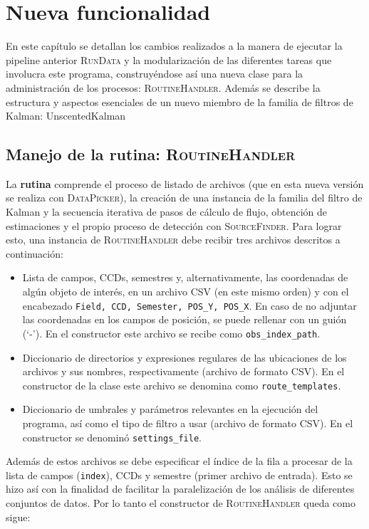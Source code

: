 \chapter{Nueva funcionalidad}
\label{ch:news}
En este cap\'itulo se detallan los cambios realizados a la  manera de ejecutar la pipeline anterior \textsc{RunData} y la modularizaci\'on de las diferentes tareas que involucra este programa, construy\'endose as\'i una nueva clase para la administraci\'on de los procesos: \textsc{RoutineHandler}. Adem\'as se describe la estructura y aspectos esenciales de un nuevo miembro de la familia de filtros de Kalman: \textsf{UnscentedKalman}


\section{Manejo de la rutina: \textsc{RoutineHandler}}

La \textbf{rutina} comprende el proceso de listado de archivos (que en esta nueva versi\'on se realiza con \textsc{DataPicker}), la creaci\'on de una instancia de la familia del filtro de Kalman y la secuencia iterativa de pasos de c\'alculo de flujo, obtenci\'on de estimaciones y el propio proceso de detecci\'on con \textsc{SourceFinder}. Para lograr esto, una instancia de \textsc{RoutineHandler} debe recibir tres archivos descritos a continuaci\'on:

\begin{itemize}
\item Lista de campos, CCDs, semestres y, alternativamente, las coordenadas de alg\'un objeto de inter\'es, en un archivo CSV (en este mismo orden) y con el encabezado \texttt{Field, CCD, Semester, POS\_Y, POS\_X}. En caso de no adjuntar las coordenadas en los campos de posici\'on, se puede rellenar con un gui\'on (`-'). En el constructor este archivo se recibe como \texttt{obs\_index\_path}.
\item Diccionario de directorios y expresiones regulares de las ubicaciones de los archivos y sus nombres, respectivamente (archivo de formato CSV). En el constructor de la clase este archivo se denomina como \texttt{route\_templates}.
\item Diccionario de umbrales y par\'ametros relevantes en la ejecuci\'on del programa, as\'i como el tipo de filtro a usar (archivo de formato CSV). En el constructor se denomin\'o \texttt{settings\_file}.
\end{itemize}
\bigskip
Adem\'as de estos archivos se debe especificar el \'indice de la fila a procesar de la lista de campos (\texttt{index}), CCDs y semestre (primer archivo de entrada). Esto se hizo as\'i con la finalidad de facilitar la paralelizaci\'on de los an\'alisis de diferentes conjuntos de datos. Por lo tanto el constructor de \textsc{RoutineHandler} queda como sigue:

